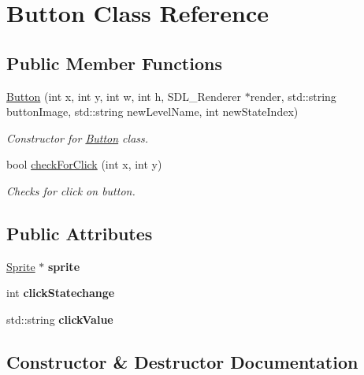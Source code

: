 \hypertarget{class_button}{}\section{Button Class Reference}
\label{class_button}
\subsection*{Public Member Functions}
\begin{DoxyCompactItemize}
\item 
\hyperlink{class_button_a03de1bbd9fc5b177e3cd434f3ea85bae}{Button} (int x, int y, int w, int h, S\+D\+L\+\_\+\+Renderer $\ast$render, std\+::string button\+Image, std\+::string new\+Level\+Name, int new\+State\+Index)
\begin{DoxyCompactList}\small\item\em Constructor for \hyperlink{class_button}{Button} class. \end{DoxyCompactList}\item 
bool \hyperlink{class_button_a70d76c8c8a4e806f8a71771246cb18e2}{check\+For\+Click} (int x, int y)
\begin{DoxyCompactList}\small\item\em Checks for click on button. \end{DoxyCompactList}\end{DoxyCompactItemize}
\subsection*{Public Attributes}
\begin{DoxyCompactItemize}
\item 
\hypertarget{class_button_a51a8770221b4166852ebc54e8736c3f9}{}\hyperlink{class_sprite}{Sprite} $\ast$ {\bfseries sprite}\label{class_button_a51a8770221b4166852ebc54e8736c3f9}

\item 
\hypertarget{class_button_ae610e8cdd14cd5714c897e74605feda8}{}int {\bfseries click\+Statechange}\label{class_button_ae610e8cdd14cd5714c897e74605feda8}

\item 
\hypertarget{class_button_a4b7dcf42aa8dffdfce5ea3bc247d03a4}{}std\+::string {\bfseries click\+Value}\label{class_button_a4b7dcf42aa8dffdfce5ea3bc247d03a4}

\end{DoxyCompactItemize}


\subsection{Constructor \& Destructor Documentation}
\hypertarget{class_button_a03de1bbd9fc5b177e3cd434f3ea85bae}{}
